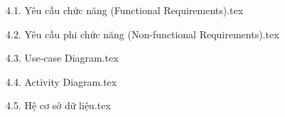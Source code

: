 
{4.1. Yêu cầu chức năng (Functional Requirements).tex}

{4.2. Yêu cầu phi chức năng (Non-functional Requirements).tex}

{4.3. Use-case Diagram.tex}

{4.4. Activity Diagram.tex}

{4.5. Hệ cơ sở dữ liệu.tex}